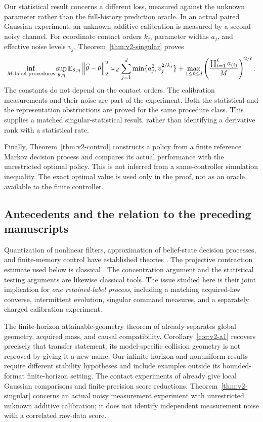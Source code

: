 Our statistical result concerns a different loss, measured against the
unknown parameter rather than the full-history prediction oracle. In an
actual paired Gaussian experiment, an unknown additive calibration is
measured by a second noisy channel. For coordinate contact orders $k_j$,
parameter widths $a_j$, and effective noise levels $v_j$,
Theorem~\ref{thm:v2-singular} proves
\[
 \inf_{\text{$M$-label procedures}}\sup_{\theta,\eta}
 \mathbb E_{\theta,\eta}\left\lVert \widehat\theta-\theta\right\rVert_2^2
 \asymp_d
 \sum_{j=1}^d\min\{a_j^2,v_j^{2/k_j}\}
 +\max_{1\le\ell\le d}
       \left(\frac{\prod_{i=1}^{\ell}a_{(i)}}{M}\right)^{2/\ell}.
\]
The constants do not depend on the contact orders. The calibration
measurements and their noise are part of the experiment. Both the
statistical and the representation obstructions are proved for the same
procedure class. This supplies a matched singular-statistical result,
rather than identifying a derivative rank with a statistical rate.

Finally, Theorem~\ref{thm:v2-control} constructs a policy from a finite
reference Markov decision process and compares its actual performance
with the unrestricted optimal policy. This is not inferred from a
same-controller simulation inequality. The exact optimal value is used
only in the proof, not as an oracle available to the finite controller.

\subsection{Antecedents and the relation to the preceding manuscripts}
Quantization of nonlinear filters, approximation of belief-state decision
processes, and finite-memory control have established theories
\cite{PagesPham2005,SaldiYukselLinder2017,KaraYuksel2022,SSSM2022}.
The projective contraction estimate used below is classical
\cite{Bushell1973}. The concentration argument and the statistical testing
arguments are likewise classical tools. The issue studied here is their
joint implication for \emph{one retained-label process}, including a
matching acquired-law converse, intermittent evolution, singular command
measures, and a separately charged calibration experiment.

The finite-horizon attainable-geometry theorem of \cite{QiA1} already
separates global geometry, acquired mass, and causal compatibility.
Corollary~\ref{cor:v2-a1} recovers precisely that transfer statement;
its model-specific collision geometry is not reproved by giving it a new
name. Our infinite-horizon and nonuniform results require different
stability hypotheses and include examples outside its bounded-format
finite-horizon setting. The contact experiments of \cite{QiA2} already
give local Gaussian comparisons and finite-precision score reductions.
Theorem~\ref{thm:v2-singular} concerns an actual noisy measurement experiment
with unrestricted unknown additive calibration; it does not identify
independent measurement noise with a correlated raw-data score.


